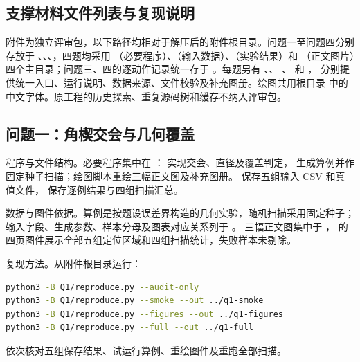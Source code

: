 \begin{appendices}
\renewcommand{\thesubsection}{\Alph{section}.\arabic{subsection}}
\renewcommand{\lstlistingname}{程序}
\lstset{breaklines=true, breakatwhitespace=false, columns=fullflexible,
        keepspaces=true, showstringspaces=false, basicstyle=\ttfamily\footnotesize}

\section{支撑材料文件列表与复现说明}\label{app:files}
附件为独立评审包，以下路径均相对于解压后的附件根目录。问题一至问题四分别存放于
、、、，四题均采用
（必要程序）、（输入数据）、（实验结果）和
（正文图片）四个主目录；问题三、四的逐动作记录统一存于
。每题另有 、、
、 和 ，
分别提供统一入口、运行说明、数据来源、文件校验及补充图册。绘图共用根目录
 中的中文字体。原工程的历史探索、重复源码树和缓存不纳入评审包。

\subsection{问题一：角楔交会与几何覆盖}
{\heiti 程序与文件结构。}必要程序集中在 ：
 实现交会、直径及覆盖判定，
 生成算例并作固定种子扫描；绘图脚本重绘三幅正文图及补充图册。
 保存五组输入 CSV 和真值文件， 保存逐例结果与四组扫描汇总。

{\heiti 数据与图件依据。}算例是按题设误差界构造的几何实验，随机扫描采用固定种子；
输入字段、生成参数、样本分母及图表对应关系列于 。
三幅正文图集中于 ， 的四页图件展示全部五组定位区域和四组扫描统计，失败样本未剔除。

{\heiti 复现方法。}从附件根目录运行：
\begin{lstlisting}[language=bash,caption={问题一的核验与复现入口}]
python3 -B Q1/reproduce.py --audit-only
python3 -B Q1/reproduce.py --smoke --out ../q1-smoke
python3 -B Q1/reproduce.py --figures --out ../q1-figures
python3 -B Q1/reproduce.py --full --out ../q1-full
\end{lstlisting}
依次核对五组保存结果、试运行算例、重绘图件及重跑全部扫描。


\end{appendices}
